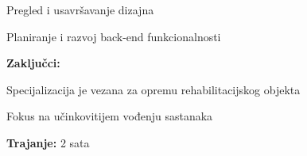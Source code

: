 \begin{packed_enum}
\begin{packed_item}
\begin{packed_item}
\begin{packed_item}
                        \item Pregled i usavršavanje dizajna
                        \item Planiranje i razvoj back-end funkcionalnosti
                    \end{packed_item}
                \item \textbf{Zaključci:}
                    \begin{packed_item}
                        \item Specijalizacija je vezana za opremu rehabilitacijskog objekta
                        \item Fokus na učinkovitijem vođenju sastanaka
                    \end{packed_item}
                \item \textbf{Trajanje:} 2 sata
            \end{packed_item}
    \end{packed_item}
	

\end{packed_enum}
